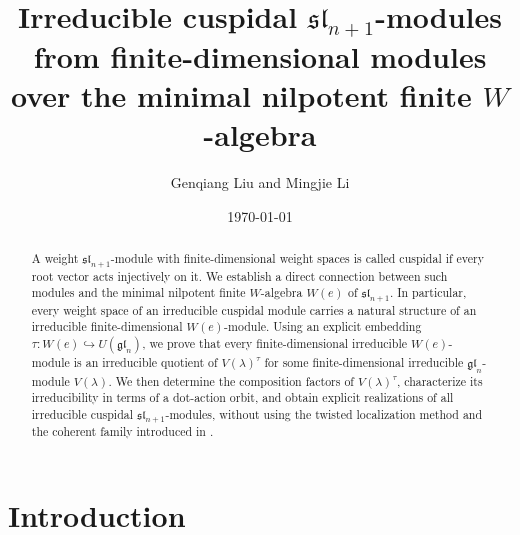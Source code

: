 \documentclass[12pt,a4paper]{amsart}
\title[Minimal nilpotent finite $W$-algebra]{\bf
Irreducible cuspidal $\mathfrak{sl}_{n+1}$-modules
from finite-dimensional  modules over
 the minimal nilpotent finite $W$-algebra}
\author{Genqiang Liu and Mingjie Li}
\date{\today}
\numberwithin{equation}{section}
\begin{document}
\begin{abstract}A weight $\mathfrak{sl}_{n+1}$-module with finite-dimensional weight spaces is called cuspidal if every root vector acts injectively on it. We establish  a direct connection between such modules and the minimal nilpotent finite $W$-algebra $W(e)$ of $\mathfrak{sl}_{n+1}$. In particular, every weight space of an irreducible cuspidal module carries a natural structure of an irreducible finite-dimensional $W(e)$-module. Using an explicit embedding $\tau\colon W(e)\hookrightarrow U(\mathfrak{gl}_n)$, we prove that every finite-dimensional irreducible $W(e)$-module is an irreducible quotient of $V(\lambda)^\tau$ for some finite-dimensional irreducible $\mathfrak{gl}_n$-module $V(\lambda)$. We then determine the composition factors of $V(\lambda)^\tau$, characterize its irreducibility in terms of a dot-action orbit, and obtain explicit realizations of all irreducible cuspidal $\mathfrak{sl}_{n+1}$-modules, without using the twisted localization method and the coherent family introduced in \cite{M}.
\end{abstract}
\vspace{5mm}
\maketitle
{}
\vspace{2mm}



\section{Introduction}
\end{document}
